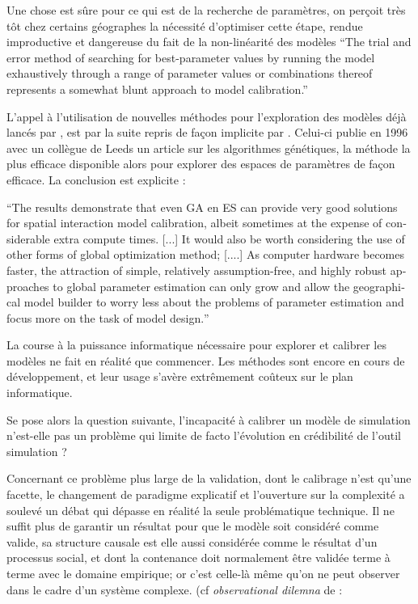 Une chose est sûre pour ce qui est de la recherche de paramètres, on perçoit très tôt chez certains géographes la nécessité d'optimiser cette étape, rendue improductive et dangereuse du fait de la non-linéarité des modèles \enquote{The trial and error method of searching for best-parameter values by running the model exhaustively through a range of parameter values or combinations thereof represents a somewhat blunt approach to model calibration.}

L'appel à l'utilisation de nouvelles méthodes pour l'exploration des modèles déjà lancés par \textcite{Batty1976}, est par la suite repris de façon implicite par \textcite{Openshaw1996}. Celui-ci publie en 1996 avec un collègue de Leeds un article sur les algorithmes génétiques, la méthode la plus efficace disponible alors pour explorer des espaces de paramètres de façon efficace. La conclusion est explicite :

\foreignquote{english}{The results demonstrate that even GA en ES can provide very good solutions for spatial interaction model calibration, albeit sometimes at the expense of considerable extra compute times. [...] It would also be worth considering the use of other forms of global optimization method; [....] As computer hardware becomes faster, the attraction of simple, relatively assumption-free, and highly robust approaches to global parameter estimation can only grow and allow the geographical model builder to worry less about the problems of parameter estimation and focus more on the task of model design.}\autocite{Openshaw1996}

La course à la puissance informatique nécessaire pour explorer et calibrer les modèles ne fait en réalité que commencer. Les méthodes sont encore en cours de développement, et leur usage s'avère extrêmement coûteux sur le plan informatique.

Se pose alors la question suivante, l'incapacité à calibrer un modèle de simulation n'est-elle pas un problème qui limite de facto l'évolution en crédibilité de l'outil simulation ? 

Concernant ce problème plus large de la validation, dont le calibrage n'est qu'une facette, le changement de paradigme explicatif et l'ouverture sur la complexité a soulevé un débat qui dépasse en réalité la seule problématique technique. Il ne suffit plus de garantir un résultat pour que le modèle soit considéré comme valide, sa structure causale est elle aussi considérée comme le résultat d'un processus social, et dont la contenance doit normalement être validée terme à terme avec le domaine empirique; or c'est celle-là même qu'on ne peut observer dans le cadre d'un système complexe. (cf \textit{observational dilemna} de \textcite[296]{Batty1976} :

